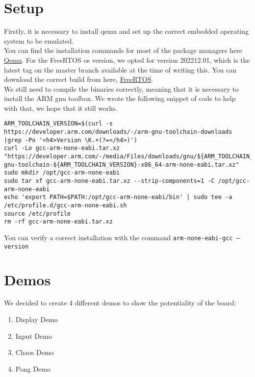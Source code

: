 \documentclass{article}
\begin{document}
\section{Setup}
Firstly, it is necessary to install qemu and set up the correct embedded operating system to be emulated.\\
You can find the installation commands for most of the package managers here \hyperlink{https://www.qemu.org/download/}{Qemu}. For the FreeRTOS os version, we opted for version 202212.01, which is the latest tag on the master branch available at the time of writing this. You can download the correct build from here, \hyperlink{https://github.com/FreeRTOS/FreeRTOS/releases/download/202212.01/FreeRTOSv202212.01.zip}{FreeRTOS}.\\ 
We still need to compile the binaries correctly, meaning that it is necessary to install the ARM gnu toolbox. We wrote the following snippet of code to help with that, we hope that it still works.
\begin{verbatim}
ARM_TOOLCHAIN_VERSION=$(curl -s https://developer.arm.com/downloads/-/arm-gnu-toolchain-downloads |grep -Po '<h4>Version \K.+(?=</h4>)')
curl -Lo gcc-arm-none-eabi.tar.xz "https://developer.arm.com/-/media/Files/downloads/gnu/${ARM_TOOLCHAIN_VERSION}/binrel/arm-gnu-toolchain-${ARM_TOOLCHAIN_VERSION}-x86_64-arm-none-eabi.tar.xz"
sudo mkdir /opt/gcc-arm-none-eabi
sudo tar xf gcc-arm-none-eabi.tar.xz --strip-components=1 -C /opt/gcc-arm-none-eabi
echo 'export PATH=$PATH:/opt/gcc-arm-none-eabi/bin' | sudo tee -a /etc/profile.d/gcc-arm-none-eabi.sh
source /etc/profile
rm -rf gcc-arm-none-eabi.tar.xz
\end{verbatim}
You can verify a correct installation with the command \texttt{arm-none-eabi-gcc --version}

\section{Demos}
We decided to create 4 different demos to show the potentiality of the board:
\begin{enumerate}
    \item Display Demo \label{Dis}
    \item Input Demo \label{Inp}
    \item Chaos Demo \label{Chaos}
    \item Pong Demo \label{pong}
\end{enumerate}
\end{document}
